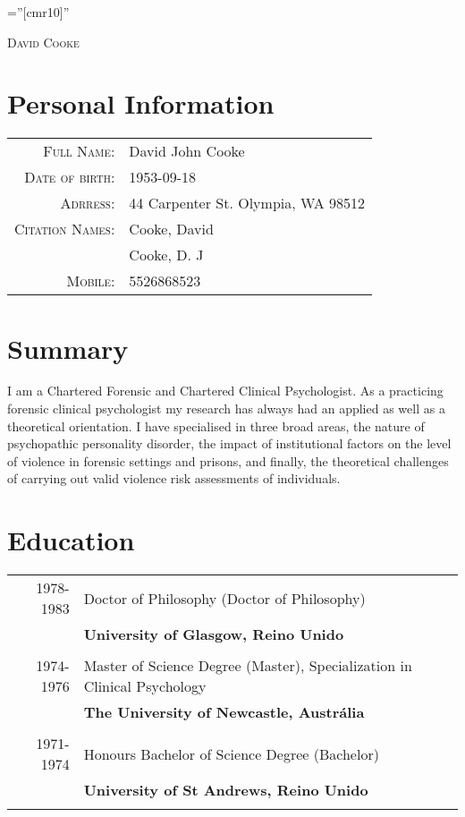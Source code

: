 \documentclass [a4paper,10pt]{article}
\begin{document}
\pagestyle{empty} %

\font\fb=''[cmr10]'' %

\par{\centering
		{\Huge   \textsc{David Cooke }
	}\bigskip\par}

\section{Personal Information}

\begin{tabular}{rl}
    \textsc{Full Name:} & David John Cooke \\
    \textsc{Date of birth:} & 1953-09-18 \\
    \textsc{Adrress:}   & 44 Carpenter St.
    Olympia, WA 98512\\
    \textsc{Citation Names:}   & Cooke, David \\ & Cooke, D. J\\
    \textsc{Mobile:}     & 5526868523\\
\end{tabular}

\section{Summary}
I am a Chartered Forensic and Chartered Clinical Psychologist. As a practicing forensic clinical psychologist my research has always had an applied as well as a theoretical orientation. I have specialised in three broad areas, the nature of psychopathic personality disorder, the impact of institutional factors on the level of violence in forensic settings and prisons, and finally, the theoretical challenges of carrying out valid violence risk assessments of individuals. 
\section{Education}
\begin{tabular}{r p{11cm}}	
\\
\textsc{1978-1983} & Doctor of Philosophy (Doctor of Philosophy) \\ & \textbf{University of Glasgow, Reino Unido}\\
\\\textsc{1974-1976} & Master of Science Degree (Master), Specialization in Clinical Psychology  \\ & \textbf{The University of Newcastle, Austrália}\\
\\\textsc{1971-1974} & Honours Bachelor of Science Degree (Bachelor) \\ & \textbf{University of St Andrews, Reino Unido}\\
\\
\end{tabular}
\end{document}
